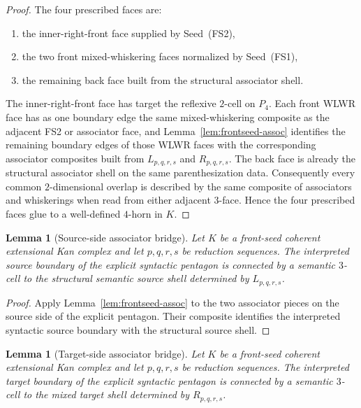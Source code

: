 \documentclass[webpdf,traditional,large,numbered]{oup-authoring-template}
\theoremstyle{thmstyleone}%
\newtheorem{lemma}[theorem]{Lemma}
\theoremstyle{thmstyletwo}%
\theoremstyle{thmstylethree}%
\begin{document}
\begin{proof}
The four prescribed faces are:
\begin{enumerate}[label=(\alph*)]
  \item the inner-right-front face supplied by Seed~(FS2),
  \item the two front mixed-whiskering faces normalized by Seed~(FS1),
  \item the remaining back face built from the structural associator shell.
\end{enumerate}
The inner-right-front face has target the reflexive $2$-cell on $P_4$.  Each
front WLWR face has as one boundary edge the same mixed-whiskering composite as
the adjacent FS2 or associator face, and
Lemma~\ref{lem:frontseed-assoc} identifies the remaining boundary edges of those
WLWR faces with the corresponding associator composites built from
$L_{p,q,r,s}$ and $R_{p,q,r,s}$.  The back face is already the structural
associator shell on the same parenthesization data.  Consequently every common
$2$-dimensional overlap is described by the same composite of associators and
whiskerings when read from either adjacent $3$-face.  Hence the four prescribed
faces glue to a well-defined $4$-horn in $K$.
\end{proof}

\begin{lemma}[Source-side associator bridge]\label{lem:frontseed-source-bridge}
Let $K$ be a front-seed coherent extensional Kan complex and let $p,q,r,s$ be
reduction sequences.  The interpreted source boundary of the explicit syntactic
pentagon is connected by a semantic $3$-cell to the structural semantic source
shell determined by $L_{p,q,r,s}$.
\end{lemma}

\begin{proof}
Apply Lemma~\ref{lem:frontseed-assoc} to the two associator pieces on the source
side of the explicit pentagon.  Their composite identifies the interpreted
syntactic source boundary with the structural source shell.
\end{proof}

\begin{lemma}[Target-side associator bridge]\label{lem:frontseed-target-bridge}
Let $K$ be a front-seed coherent extensional Kan complex and let $p,q,r,s$ be
reduction sequences.  The interpreted target boundary of the explicit syntactic
pentagon is connected by a semantic $3$-cell to the mixed target shell
determined by $R_{p,q,r,s}$.
\end{lemma}
\end{document}
